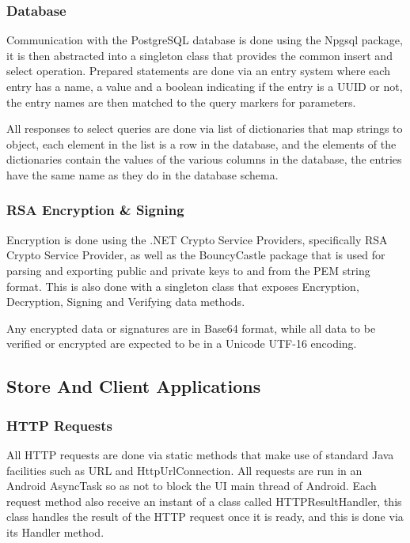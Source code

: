 \documentclass[12pt]{article}
\begin{document}
\subsubsection{Database}
\hspace{0.6cm}
Communication with the PostgreSQL database is done using the Npgsql package, it is then abstracted into a singleton class that provides the common insert and select operation. Prepared
statements are done via an entry system where each entry has a name, a value and a boolean indicating if the entry is a UUID or not, the entry names are then matched to the
query markers for parameters.

All responses to select queries are done via list of dictionaries that map strings to object, each element in the list is a row in the database, and the elements of the dictionaries
contain the values of the various columns in the database, the entries have the same name as they do in the database schema.

\subsubsection{RSA Encryption \& Signing}
\hspace{0.6cm}
Encryption is done using the .NET Crypto Service Providers, specifically RSA Crypto Service Provider, as well as the BouncyCastle package that is used for parsing and exporting public and private
keys to and from the PEM string format. This is also done with a singleton class that exposes Encryption, Decryption, Signing and Verifying data methods.

Any encrypted data or signatures are in Base64 format, while all data to be verified or encrypted are expected to be in a Unicode UTF-16 encoding.

\subsection{Store And Client Applications}

\subsubsection{HTTP Requests}
\hspace{0.6cm}
All HTTP requests are done via static methods that make use of standard Java facilities such as URL and HttpUrlConnection. All requests are run in an Android AsyncTask so as not
to block the UI main thread of Android. Each request method also receive an instant of a class called HTTPResultHandler, this class handles the result of the HTTP request once
it is ready, and this is done via its Handler method.
\end{document}
